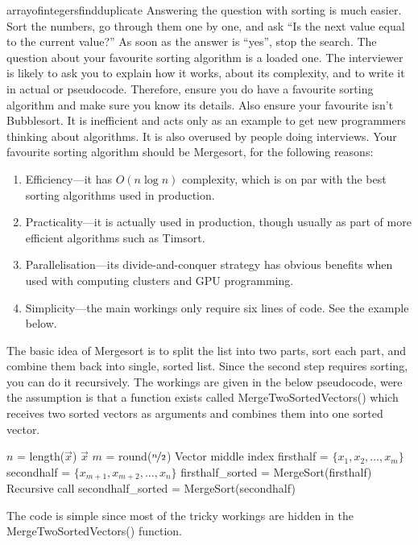 \begin{answer}{arrayofintegersfindduplicate}
 Answering the question with sorting is much easier.
 Sort the numbers, go through them one by one, and ask ``Is the next value equal to the current value?''
 As soon as the answer is ``yes'', stop the search.
 The question about your favourite sorting algorithm is a loaded one.
 The interviewer is likely to ask you to explain how it works, about its complexity, and to write it in actual or pseudocode.
 Therefore, ensure you do have a favourite sorting algorithm and make sure you know its details.
 Also ensure your favourite isn't Bubblesort.
 It is inefficient and acts only as an example to get new programmers thinking about algorithms.
 It is also overused by people doing interviews.
Your favourite sorting algorithm should be Mergesort, for the following reasons:
 \begin{enumerate}
   \item Efficiency---it has $O(n \log n)$ complexity, which is on par with the best sorting algorithms used in production.
   \item Practicality---it is actually used in production, though usually as part of more efficient algorithms such as Timsort.
   \item Parallelisation---its divide-and-conquer strategy has obvious benefits when used with computing clusters and GPU programming.
   \item Simplicity---the main workings only require six lines of code. See the example below.
 \end{enumerate}
The basic idea of Mergesort is to split the list into two parts, sort each part, and combine them back into single, sorted list.
Since the second step requires sorting, you can do it recursively.
The workings are given in the below pseudocode, were the assumption is that a function exists called
MergeTwoSortedVectors()
which receives two sorted vectors as arguments and combines them into one sorted vector.
\begin{algorithmic}[1]
  \Statex
  \State
        $n$ = length($\vec{x}$)
      \State
      \Return $\vec{x}$
     \EndIf
  \State
  $m$ = round($\nicefrac{n}{2}$) \Comment Vector middle index
  \State
  firsthalf = $\{x_1, x_2, \ldots ,x_m\}$
  \State
  secondhalf = $\{x_{m+1}, x_{m+2}, \ldots, x_n \}$
  \State
  firsthalf\_sorted = MergeSort(firsthalf)
  \Comment Recursive call
  \State
  secondhalf\_sorted = MergeSort(secondhalf)
      \State {}
  \EndFunction
\end{algorithmic}
The code is simple since most of the tricky workings are hidden in the MergeTwoSortedVectors() function.


\end{answer}
